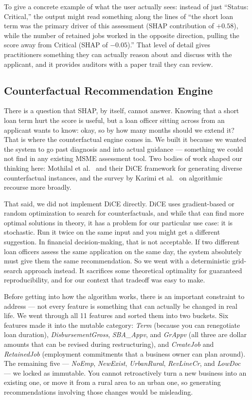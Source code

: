 To give a concrete example of what the user actually sees: instead of just ``Status: Critical,'' the output might read something along the lines of ``the short loan term was the primary driver of this assessment (SHAP contribution of $+0.58$), while the number of retained jobs worked in the opposite direction, pulling the score away from Critical (SHAP of $-0.05$).'' That level of detail gives practitioners something they can actually reason about and discuss with the applicant, and it provides auditors with a paper trail they can review.

\subsection{Counterfactual Recommendation Engine}

There is a question that SHAP, by itself, cannot answer. Knowing that a short loan term hurt the score is useful, but a loan officer sitting across from an applicant wants to know: okay, so by how many months should we extend it? That is where the counterfactual engine comes in. We built it because we wanted the system to go past diagnosis and into actual guidance --- something we could not find in any existing MSME assessment tool. Two bodies of work shaped our thinking here: Mothilal et al.\ \cite{20} and their DiCE framework for generating diverse counterfactual instances, and the survey by Karimi et al.\ \cite{21} on algorithmic recourse more broadly.

That said, we did not implement DiCE directly. DiCE uses gradient-based or random optimization to search for counterfactuals, and while that can find more optimal solutions in theory, it has a problem for our particular use case: it is stochastic. Run it twice on the same input and you might get a different suggestion. In financial decision-making, that is not acceptable. If two different loan officers assess the same application on the same day, the system absolutely must give them the same recommendation. So we went with a deterministic grid-search approach instead. It sacrifices some theoretical optimality for guaranteed reproducibility, and for our context that tradeoff was easy to make.

Before getting into how the algorithm works, there is an important constraint to address --- not every feature is something that can actually be changed in real life. We went through all 11 features and sorted them into two buckets. Six features made it into the mutable category: \textit{Term} (because you can renegotiate loan duration), \textit{DisbursementGross}, \textit{SBA\_Appv}, and \textit{GrAppv} (all three are dollar amounts that can be revised during restructuring), and \textit{CreateJob} and \textit{RetainedJob} (employment commitments that a business owner can plan around). The remaining five --- \textit{NoEmp}, \textit{NewExist}, \textit{UrbanRural}, \textit{RevLineCr}, and \textit{LowDoc} --- we locked as immutable. You cannot retroactively turn a new business into an existing one, or move it from a rural area to an urban one, so generating recommendations involving those changes would be misleading.

